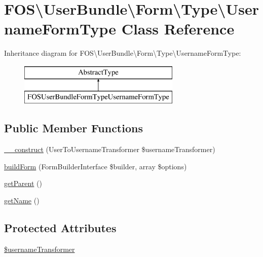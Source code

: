 \hypertarget{class_f_o_s_1_1_user_bundle_1_1_form_1_1_type_1_1_username_form_type}{\section{F\+O\+S\textbackslash{}User\+Bundle\textbackslash{}Form\textbackslash{}Type\textbackslash{}Username\+Form\+Type Class Reference}
\label{class_f_o_s_1_1_user_bundle_1_1_form_1_1_type_1_1_username_form_type}
}
Inheritance diagram for F\+O\+S\textbackslash{}User\+Bundle\textbackslash{}Form\textbackslash{}Type\textbackslash{}Username\+Form\+Type\+:\begin{figure}[H]
\begin{center}
\leavevmode
\includegraphics[height=2.000000cm]{class_f_o_s_1_1_user_bundle_1_1_form_1_1_type_1_1_username_form_type}
\end{center}
\end{figure}
\subsection*{Public Member Functions}
\begin{DoxyCompactItemize}
\item 
\hyperlink{class_f_o_s_1_1_user_bundle_1_1_form_1_1_type_1_1_username_form_type_a81950eb8f40809b86d0603ade34947d7}{\+\_\+\+\_\+construct} (User\+To\+Username\+Transformer \$username\+Transformer)
\item 
\hyperlink{class_f_o_s_1_1_user_bundle_1_1_form_1_1_type_1_1_username_form_type_a83d3ac1457fc62a4c884d2bd24fe84c2}{build\+Form} (Form\+Builder\+Interface \$builder, array \$options)
\item 
\hyperlink{class_f_o_s_1_1_user_bundle_1_1_form_1_1_type_1_1_username_form_type_ad567e8158a2e5f40f0dafb7680b18f62}{get\+Parent} ()
\item 
\hyperlink{class_f_o_s_1_1_user_bundle_1_1_form_1_1_type_1_1_username_form_type_a6bab4476099f20a691ae4e10cd75fee7}{get\+Name} ()
\end{DoxyCompactItemize}
\subsection*{Protected Attributes}
\begin{DoxyCompactItemize}
\item 
\hyperlink{class_f_o_s_1_1_user_bundle_1_1_form_1_1_type_1_1_username_form_type_aca625cf59e18770eed14f21a23756c4d}{\$username\+Transformer}
\end{DoxyCompactItemize}


